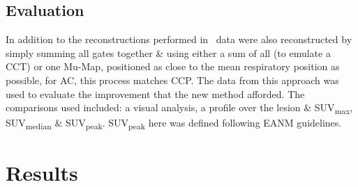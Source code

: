     \subsection{Evaluation} \label{sec:evaluation}
        
        In addition to the reconstructions performed in~ data were also reconstructed by simply summing all gates together \& using either a sum of all  (to emulate a \gls{CCT}) or one \gls{Mu-Map}, positioned as close to the mean respiratory position as possible, for \gls{AC}, this process matches \gls{CCP}. The data from this approach was used to evaluate the improvement that the new method afforded. The comparisons used included: a visual analysis, a profile over the lesion \& \gls{SUV}\textsubscript{max}, \gls{SUV}\textsubscript{median} \& \gls{SUV}\textsubscript{peak}. \gls{SUV}\textsubscript{peak} here was defined following \gls{EANM} guidelines.%

\section{Results} \label{sec:results}
    
    
